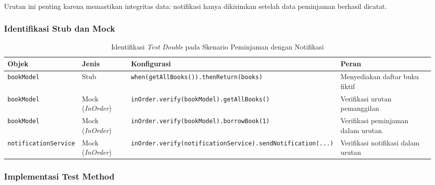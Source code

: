 \documentclass[12pt,a4paper]{article}
\begin{document}
Urutan ini penting karena memastikan integritas data: notifikasi hanya
dikirimkan setelah data peminjaman berhasil dicatat.

\subsubsection{Identifikasi Stub dan Mock}

\begin{table}[H]
\centering
\caption{Identifikasi \textit{Test Double} pada Skenario Peminjaman dengan Notifikasi}
\label{tab:stub-mock-notification}
\begin{tabular}{@{}p{3.5cm}p{2.5cm}p{4.5cm}p{3cm}@{}}
\toprule
\textbf{Objek} & \textbf{Jenis} & \textbf{Konfigurasi} & \textbf{Peran} \\
\midrule
\texttt{bookModel} &
    Stub &
    \texttt{when(getAllBooks()).thenReturn(books)} &
    Menyediakan daftar buku fiktif \\
\addlinespace
\texttt{bookModel} &
    Mock (\textit{InOrder}) &
    \texttt{inOrder.verify(bookModel).getAllBooks()} &
    Verifikasi urutan pemanggilan \\
\addlinespace
\texttt{bookModel} &
    Mock (\textit{InOrder}) &
    \texttt{inOrder.verify(bookModel).borrowBook(1)} &
    Verifikasi peminjaman dalam urutan \\
\addlinespace
\texttt{notificationService} &
    Mock (\textit{InOrder}) &
    \texttt{inOrder.verify(notificationService).sendNotification(...)} &
    Verifikasi notifikasi dalam urutan \\
\bottomrule
\end{tabular}
\end{table}

\subsubsection{Implementasi Test Method}
\end{document}
